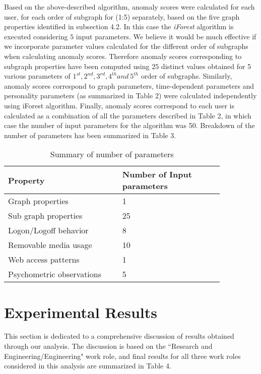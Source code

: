 \documentclass[conference,draftclsnofoot,onecolumn]{IEEEtran}%
\begin{document}
Based on the above-described algorithm, anomaly scores were calculated for each user, for each order of subgraph for (1:5) separately, based on the five graph properties identified in subsection 4.2. In this case the \textit{iForest} algorithm is executed considering $5$ input parameters. We believe it would be much effective if we incorporate parameter values calculated for the different order of subgraphs when calculating anomaly scores. Therefore anomaly scores corresponding to subgraph properties have been computed using $25$ distinct values obtained for 5 various parameters of $1^{st}, 2^{nd}, 3^{rd}, 4^{th} and\ 5^{th}$ order of subgraphs. Similarly, anomaly scores correspond to graph parameters, time-dependent parameters and personality parameters (as summarized in Table 2) were calculated independently using iForest algorithm. Finally, anomaly scores correspond to each user is calculated as a combination of all the parameters described in Table 2, in which case the number of input parameters for the algorithm was 50. Breakdown of the number of parameters has been summarized in Table 3.  

\begin{table}[!t]
\caption{Summary of number of parameters}
\begin{tabular}{|p{0.45\linewidth}|P{0.40\linewidth}|}
\hline \textbf{Property} & \textbf{Number of Input parameters}\\
\hline Graph properties & 1\\
\hline Sub graph properties & 25\\
\hline Logon/Logoff behavior & 8\\
\hline Removable media usage & 10\\
\hline Web access patterns & 1\\
\hline Psychometric observations & 5\\
\hline
\end{tabular}
\label{Table III}
\vspace{-10pt}
\end{table}

\section{Experimental Results}
This section is dedicated to a comprehensive discussion of results obtained through our analysis. The discussion is based on the ``Research and Engineering/Engineering" work role, and final results for all three work roles considered in this analysis are summarized in Table 4.
\end{document}
